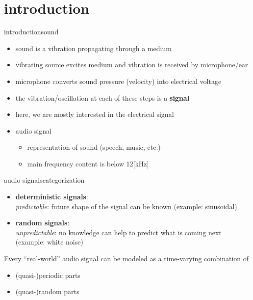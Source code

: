 



\subtitle{Part 3: Signals}


	

\section{introduction}
\begin{frame}{introduction}{sound}
    \begin{itemize}
        \item   sound is a vibration propagating through a medium
        \item   vibrating source excites medium and vibration is received by microphone/ear
        \item   microphone converts sound pressure (velocity) into electrical voltage
        
        \bigskip
        \item<2-> the vibration/oscillation at each of these steps is a \textbf{signal}
        \item<2-> here, we are mostly interested in the electrical signal
        
        \bigskip
        \item<3-> audio signal
            \begin{itemize}
                \item   representation of sound (speech, music, etc.)
                \item   main frequency content is below \unit{12}[kHz]
            \end{itemize}
    \end{itemize}
\end{frame}

\begin{frame}{audio signals}{categorization}
	\begin{itemize}
		\item	\textbf{deterministic signals}:\\
				\textit{predictable}: future shape of the signal can be known (example: sinusoidal)
		\pause		
		\item	\textbf{random signals}:\\
				\textit{unpredictable}: no knowledge can help to predict what is coming next (example: white noise)
	\end{itemize}
	
	Every ``real-world'' audio signal can be modeled as a time-varying combination of 
	\begin{itemize}
		\item	(quasi-)periodic parts
		\item	(quasi-)random parts
	\end{itemize}
\end{frame}

